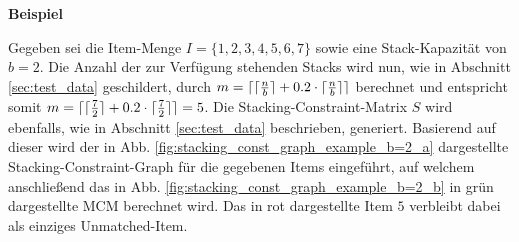 \textbf{Beispiel}

Gegeben sei die Item-Menge $I = \{1, 2, 3, 4, 5, 6, 7\}$ sowie eine Stack-Kapazität von $b = 2$.
Die Anzahl der zur Verfügung stehenden Stacks wird nun, wie in Abschnitt \ref{sec:test_data} geschildert,
durch $m = \lceil\lceil\frac{n}{b}\rceil + 0.2 \cdot \lceil\frac{n}{b}\rceil\rceil$ berechnet und entspricht somit
$m = \lceil\lceil\frac{7}{2}\rceil + 0.2 \cdot \lceil\frac{7}{2}\rceil\rceil = 5$.
Die Stacking-Constraint-Matrix $S$ wird ebenfalls, wie in Abschnitt \ref{sec:test_data} beschrieben, generiert.
Basierend auf dieser wird der in Abb. \ref{fig:stacking_const_graph_example_b=2_a} dargestellte Stacking-Constraint-Graph
für die gegebenen Items eingeführt, auf welchem anschließend das in Abb. \ref{fig:stacking_const_graph_example_b=2_b} in grün dargestellte \textsc{MCM} berechnet wird. Das in rot dargestellte Item $5$ verbleibt dabei als einziges Unmatched-Item.
